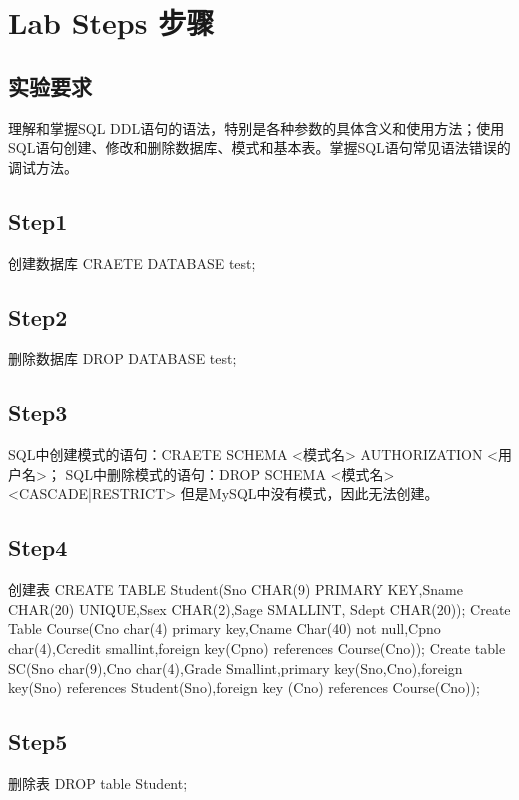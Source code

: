 \section{Lab Steps 步骤}
\subsection{实验要求}
理解和掌握SQL DDL语句的语法，特别是各种参数的具体含义和使用方法；使用SQL语句创建、修改和删除数据库、模式和基本表。掌握SQL语句常见语法错误的调试方法。
\subsection{Step1}
创建数据库
CRAETE DATABASE test;
\subsection{Step2}
删除数据库
DROP DATABASE test;
\subsection{Step3}
SQL中创建模式的语句：CRAETE SCHEMA <模式名> AUTHORIZATION <用户名>；
SQL中删除模式的语句：DROP SCHEMA <模式名><CASCADE|RESTRICT>
但是MySQL中没有模式，因此无法创建。
\subsection{Step4}
创建表
CREATE TABLE Student(Sno CHAR(9) PRIMARY KEY,Sname CHAR(20) UNIQUE,Ssex CHAR(2),Sage SMALLINT, Sdept CHAR(20));
Create Table Course(Cno char(4) primary key,Cname Char(40) not null,Cpno char(4),Ccredit smallint,foreign key(Cpno) references Course(Cno));
Create table SC(Sno char(9),Cno char(4),Grade Smallint,primary key(Sno,Cno),foreign key(Sno) references Student(Sno),foreign key (Cno) references Course(Cno));
\subsection{Step5}
删除表
DROP table Student;

